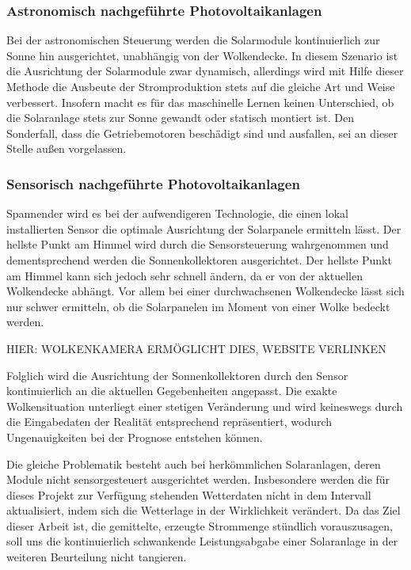 \documentclass[12pt, a4paper]{article}
\begin{document}
\subsubsection{Astronomisch nachgeführte Photovoltaikanlagen}

Bei der astronomischen Steuerung werden die Solarmodule kontinuierlich zur Sonne hin ausgerichtet, unabhängig von der Wolkendecke. In diesem Szenario ist die Ausrichtung der Solarmodule zwar dynamisch, allerdings wird mit Hilfe dieser Methode die Ausbeute der Stromproduktion stets auf die gleiche Art und Weise verbessert. Insofern macht es für das maschinelle Lernen keinen Unterschied, ob die Solaranlage stets zur Sonne gewandt oder statisch montiert ist. Den Sonderfall, dass die Getriebemotoren beschädigt sind und ausfallen, sei an dieser Stelle außen vorgelassen.

\subsubsection{Sensorisch nachgeführte Photovoltaikanlagen}

Spannender wird es bei der aufwendigeren Technologie, die einen lokal installierten Sensor die optimale Ausrichtung der Solarpanele ermitteln lässt. Der hellste Punkt am Himmel wird durch die Sensorsteuerung wahrgenommen und dementsprechend werden die Sonnenkollektoren ausgerichtet. Der hellste Punkt am Himmel kann sich jedoch sehr schnell ändern, da er von der aktuellen Wolkendecke abhängt. Vor allem bei einer durchwachsenen Wolkendecke lässt sich nur schwer ermitteln, ob die Solarpanelen im Moment von einer Wolke bedeckt werden. 

HIER: WOLKENKAMERA ERMÖGLICHT DIES, WEBSITE VERLINKEN

Folglich wird die Ausrichtung der Sonnenkollektoren durch den Sensor kontinuierlich an die aktuellen Gegebenheiten angepasst. Die exakte Wolkensituation unterliegt einer stetigen Veränderung und wird keineswegs durch die Eingabedaten der Realität entsprechend repräsentiert, wodurch Ungenauigkeiten bei der Prognose entstehen können.

Die gleiche Problematik besteht auch bei herkömmlichen Solaranlagen, deren Module nicht sensorgesteuert ausgerichtet werden. Insbesondere werden die für dieses Projekt zur Verfügung stehenden Wetterdaten  nicht in dem Intervall aktualisiert, indem sich die Wetterlage in der Wirklichkeit verändert. Da das Ziel dieser Arbeit ist, die gemittelte, erzeugte Strommenge stündlich vorauszusagen, soll uns die kontinuierlich schwankende Leistungsabgabe einer Solaranlage in der weiteren Beurteilung nicht tangieren. 
\end{document}
